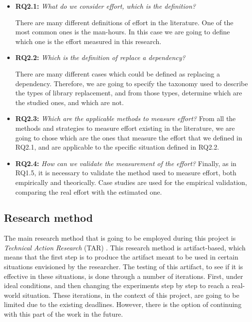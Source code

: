 \begin{itemize}
  \item \textbf{RQ2.1:} \textit{What do we consider effort, which is the definition?}

  There are many different definitions of effort in the literature. One of the most common ones is the man-hours. In this case we are going to define which one is the effort measured in this research.

  \item \textbf{RQ2.2:} \textit{Which is the definition of replace a dependency?}

  There are many different cases which could be defined as replacing a dependency. Therefore, we are going to specify the taxonomy used to describe the types of library replacement, and from those types, determine which are the studied ones, and which are not.

  \item \textbf{RQ2.3:} \textit{Which are the applicable methods to measure effort?}
  From all the methods and strategies to measure effort existing in the literature, we are going to chose which are the ones that measure the effort that we defined in RQ2.1, and are applicable to the specific situation defined in RQ2.2.

  \item \textbf{RQ2.4:} \textit{How can we validate the measurement of the effort?}
  Finally, as in RQ1.5, it is necessary to validate the method used to measure effort, both empirically and theorically. Case studies are used for the empirical validation, comparing the real effort with the estimated one.
\end{itemize}

\subsection{Research method}
The main research method that is going to be employed during this project is \textit{Technical Action Research} (TAR) \cite{wieringa2012technical}.
This research method is artifact-based, which means that the first step is to produce the artifact meant to be used in certain situations envisioned by the researcher. The testing of this artifact, to see if it is effective in these situations, is done through a number of iterations. First, under ideal conditions, and then changing the experiments step by step to reach a real-world situation. These iterations, in the context of this project, are going to be limited due to the existing deadlines. However, there is the option of continuing with this part of the work in the future.

